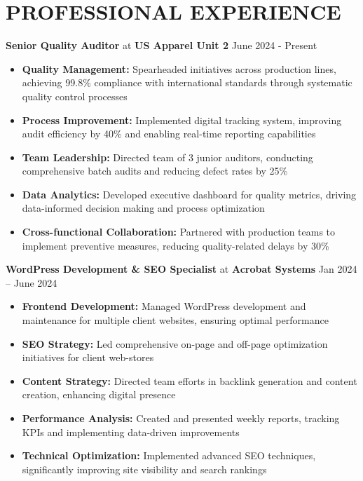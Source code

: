 \documentclass[11pt,a4paper]{article}
\newcommand{\role}[2]{{\large\textbf{#1}} \textcolor{secondary}{at} \textbf{#2}}
\newcommand{\daterange}[1]{{\color{secondary}\hfill#1}}
\begin{document}
\section*{PROFESSIONAL EXPERIENCE}
\role{Senior Quality Auditor}{US Apparel Unit 2} \daterange{June 2024 - Present}
\begin{itemize}[leftmargin=*,nosep,itemsep=4pt]
\item \textbf{Quality Management:} Spearheaded initiatives across production lines, achieving 99.8\% compliance with international standards through systematic quality control processes
\item \textbf{Process Improvement:} Implemented digital tracking system, improving audit efficiency by 40\% and enabling real-time reporting capabilities
\item \textbf{Team Leadership:} Directed team of 3 junior auditors, conducting comprehensive batch audits and reducing defect rates by 25\%
\item \textbf{Data Analytics:} Developed executive dashboard for quality metrics, driving data-informed decision making and process optimization
\item \textbf{Cross-functional Collaboration:} Partnered with production teams to implement preventive measures, reducing quality-related delays by 30\%
\end{itemize}

\vspace{0.3cm}
\role{WordPress Development \& SEO Specialist}{Acrobat Systems} \daterange{Jan 2024 – June 2024}
\begin{itemize}[leftmargin=*,nosep,itemsep=4pt]
\item \textbf{Frontend Development:} Managed WordPress development and maintenance for multiple client websites, ensuring optimal performance
\item \textbf{SEO Strategy:} Led comprehensive on-page and off-page optimization initiatives for client web-stores
\item \textbf{Content Strategy:} Directed team efforts in backlink generation and content creation, enhancing digital presence
\item \textbf{Performance Analysis:} Created and presented weekly reports, tracking KPIs and implementing data-driven improvements
\item \textbf{Technical Optimization:} Implemented advanced SEO techniques, significantly improving site visibility and search rankings
\end{itemize}
\end{document}
